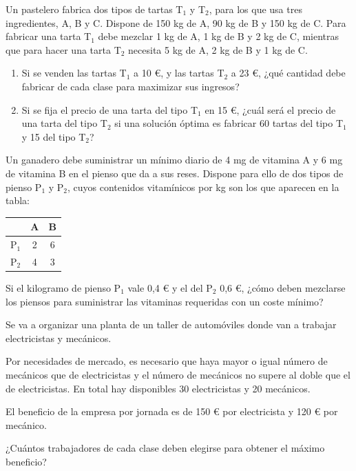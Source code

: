 \begin{Ejer}
Un pastelero fabrica dos tipos de tartas T$_1$ y T$_2$, para los que usa tres ingredientes, A, B y C. Dispone de 150 kg de A, 90 kg de B y 150 kg de C. Para fabricar una tarta T$_1$ debe mezclar 1 kg de A, 1 kg de B y 2 kg de C, mientras que para hacer una tarta T$_2$ necesita 5 kg de A, 2 kg de B y 1 kg de C.

\begin{enumerate}
\item Si se venden las tartas T$_1$ a 10 €, y las tartas T$_2$ a 23 €, ¿qu\'e cantidad debe fabricar de cada clase para maximizar sus ingresos?
\item Si se fija el precio de una tarta del tipo T$_1$ en 15 €, ¿cu\'al ser\'a el precio de una tarta del tipo T$_2$ si una soluci\'on \'optima es fabricar 60 tartas del tipo T$_1$ y 15 del tipo T$_2$?
\end{enumerate}
\end{Ejer}


\begin{Ejer}
Un ganadero debe suministrar un m\'inimo diario de 4 mg de vitamina A y 6 mg de vitamina B en el pienso que da a sus reses. Dispone para ello de dos tipos de pienso P$_1$ y P$_2$, cuyos contenidos vitam\'inicos por kg son los que aparecen en la tabla:

\begin{center}
\begin{tabular}{c|cc}
 & A & B \\
\hline
P$_1$ & 2 & 6 \\
P$_2$ & 4 & 3 \\
\end{tabular}
\end{center}

Si el kilogramo de pienso P$_1$ vale 0,4 € y el del P$_2$ 0,6 €, ¿c\'omo deben mezclarse los piensos para suministrar las vitaminas requeridas con un coste m\'inimo?
\end{Ejer}


\begin{Ejer}
Se va a organizar una planta de un taller de autom\'oviles donde van a trabajar electricistas y mec\'anicos.

Por necesidades de mercado, es necesario que haya mayor o igual n\'umero de mec\'anicos que de electricistas y el n\'umero de mec\'anicos no supere al doble que el de electricistas. En total hay disponibles 30 electricistas y 20 mec\'anicos.

El beneficio de la empresa por jornada es de 150 € por electricista y 120 € por mec\'anico.

¿Cu\'antos trabajadores de cada clase deben elegirse para obtener el m\'aximo beneficio?
\end{Ejer}

